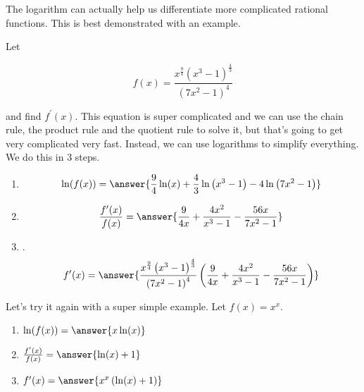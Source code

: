 \documentclass{ximera}
\begin{document}
The logarithm can actually help us differentiate more complicated rational functions. This is best demonstrated with an example.

\begin{example}
\label{example:6-13}
Let

\[
f(x)=\frac{x^{\frac{9}{4}}\left(x^{3}-1\right)^{\frac{4}{3}}}{\left(7 x^{2}-1\right)^{4}}
\]

and find $f^{\prime}(x)$. This equation is super complicated and we can use the chain rule, the product rule and the quotient rule to solve it, but that's going to get very complicated very fast. Instead, we can use logarithms to simplify everything. We do this in 3 steps.

\begin{enumerate}
\item {}
\[
\ln(f(x))=\answer{\frac{9}{4}\ln(x)+\frac{4}{3}\ln\left(x^{3}-1\right)-4\ln\left(7x^{2}-1\right)}
\]
\item {}
\[
\frac{f^{\prime}(x)}{f(x)}=\answer{\frac{9}{4x}+\frac{4x^{2}}{x^{3}-1}-\frac{56x}{7x^{2}-1}}
\]
\item {}.
\[
f^{\prime}(x)=\answer{\frac{x^{\frac{9}{4}}\left(x^{3}-1\right)^{\frac{4}{3}}}{\left(7 x^{2}-1\right)^{4}}\left(\frac{9}{4x}+\frac{4x^{2}}{x^{3}-1}-\frac{56x}{7x^{2}-1}\right)}
\]
\end{enumerate}
\end{example}

\begin{example}
\label{example:6-14}
Let's try it again with a super simple example. Let $f(x)=x^{x}$.

\begin{enumerate}
\item $\ln(f(x))=\answer{x\ln(x)}$
\item $\frac{f^{\prime}(x)}{f(x)}=\answer{\ln(x)+1}$
\item $f^{\prime}(x)=\answer{x^{x}\left(\ln(x)+1\right)}$
\end{enumerate}
\end{example}
\end{document}
